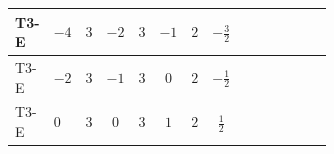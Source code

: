 \documentclass[8pt]{article}
\begin{document}
\begin{landscape}
\begin{longtable}{@{}llcccccc >{\raggedright\arraybackslash}p{0.21\linewidth} >{\raggedright\arraybackslash}p{0.21\linewidth} >{\raggedright\arraybackslash}p{0.21\linewidth}@{}}
\midrule
T3-E & $-4$ & $3$ & $-2$ & $3$ & $-1$ & $2$ & $-\frac{3}{2}$ & \scriptsize\adjustbox{max width=\linewidth}{$\begin{gathered} {\lambda_{S_1}^{(1)}} \left(\frac{1}{2} T_{\nu}^{(1)}+13 {\lambda_{S_1}^{(A)}}\right)\end{gathered}$} & \scriptsize\adjustbox{max width=\linewidth}{$\begin{gathered} +4 {\lambda_{S_1}^{(A)}} T_{\nu}^{(1)}\end{gathered}$} & \scriptsize\adjustbox{max width=\linewidth}{$\begin{gathered} -\operatorname{Tr}\!\left({y_1}\,\left({y_1}\right)^{\dagger}\,{y_1}\,\left({y_1}\right)^{\dagger}\right)\end{gathered}$} \\
\midrule
T3-E & $-2$ & $3$ & $-1$ & $3$ & $0$ & $2$ & $-\frac{1}{2}$ & \scriptsize\adjustbox{max width=\linewidth}{$\begin{gathered} {\lambda_{S_1}^{(1)}} \left(\frac{1}{2} T_{\nu}^{(1)}+13 {\lambda_{S_1}^{(A)}}\right)\end{gathered}$} & \scriptsize\adjustbox{max width=\linewidth}{$\begin{gathered} +4 {\lambda_{S_1}^{(A)}} T_{\nu}^{(1)}\end{gathered}$} & \scriptsize\adjustbox{max width=\linewidth}{$\begin{gathered} -\operatorname{Tr}\!\left({y_1}\,\left({y_1}\right)^{\dagger}\,{y_1}\,\left({y_1}\right)^{\dagger}\right)\end{gathered}$} \\
\midrule
T3-E & $0$ & $3$ & $0$ & $3$ & $1$ & $2$ & $\frac{1}{2}$ & \scriptsize\adjustbox{max width=\linewidth}{$\begin{gathered} {\lambda_{S_1}^{(1)}} \left(\frac{1}{2} T_{\nu}^{(1)}+13 {\lambda_{S_1}^{(A)}}\right)\end{gathered}$} & \scriptsize\adjustbox{max width=\linewidth}{$\begin{gathered} +4 {\lambda_{S_1}^{(A)}} T_{\nu}^{(1)}\end{gathered}$} & \scriptsize\adjustbox{max width=\linewidth}{$\begin{gathered} -\operatorname{Tr}\!\left({y_1}\,\left({y_1}\right)^{\dagger}\,{y_1}\,\left({y_1}\right)^{\dagger}\right)\end{gathered}$} \\
\midrule

\end{longtable}
\end{landscape}
\end{document}
